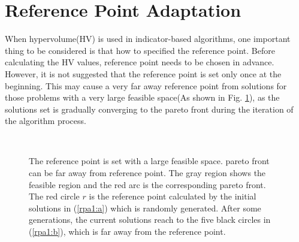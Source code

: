 \documentclass[conference]{IEEEtran}
\begin{document}

%
%
\section{Reference Point Adaptation}
When hypervolume(HV) is used in indicator-based algorithms, 
one important thing to be considered is that how to specified the reference point.
Before calculating the HV values, reference point needs to be chosen in advance.
However, it is not suggested that the reference point is set only once at the beginning.
\cite{ut}  %
This may cause a very far away reference point from solutions
for those problems with a very large feasible space(As shown in Fig. \ref{rpa1}),
as the solutions set is gradually converging to the pareto front
during the iteration of the algorithm process.

\begin{figure}[!t]
  \centering
  \quad
  \\
  \caption{The reference point is set with a large feasible space.
  pareto front can be far away from reference point.
  The gray region shows the feasible region and the red arc is the corresponding pareto front.
  The red circle $r$ is the reference point calculated by the initial solutions in (\ref{rpa1:a})
  which is randomly generated.
  After some generations, the current solutions reach to the five black circles in (\ref{rpa1:b}), 
  which is far away from the reference point.}
  \label{rpa1}
\end{figure}
\end{document}
